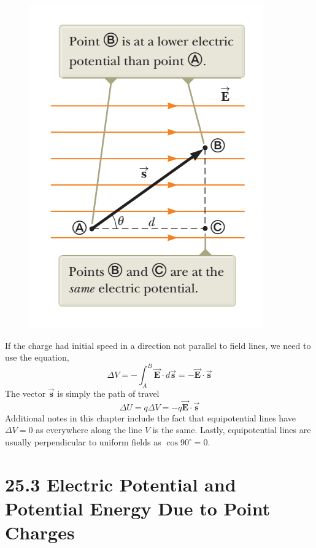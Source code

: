 \documentclass[12pt, titlepage, oneside]{article}
\let\oldvec\vec
\renewcommand{\vec}[1]{\oldvec{\bm{#1}}}
\begin{document}
\begin{figure}
	\begin{center}
	\vspace{-1cm}
		\includegraphics[scale=1]{2.png}
	\end{center}
\end{figure} 
\noindent If the charge had initial speed in a direction not parallel to field lines, we need to use the equation,
\begin{equation*}
\Delta V = - \int_A^B \vec{E} \cdot d\vec{s} = -\vec{E} \cdot \vec{s}
\end{equation*}
The vector $\vec{s}$ is simply the path of travel
\begin{equation*}
\Delta U = q \Delta V = -q \vec{E} \cdot \vec{s}
\end{equation*}
Additional notes in this chapter include the fact that equipotential lines have $\Delta V = 0$ as everywhere along the line $V$ is the same. Lastly, equipotential lines are usually perpendicular to uniform fields as $\cos 90^{\circ} = 0$.
\section*{25.3 Electric Potential and Potential Energy Due to Point Charges}
\end{document}

